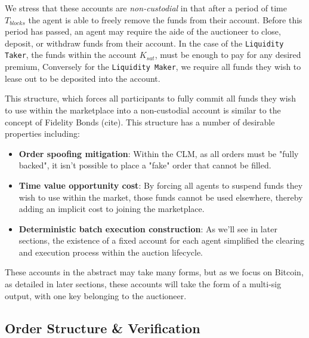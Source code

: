 \documentclass[12pt,a4paper]{article}
\theoremstyle{definition}
\begin{document}
We stress that these accounts are \emph{non-custodial} in that after a period
of time $T_{blocks}$ the agent is able to freely remove the funds from their
account. Before this period has passed, an agent may require the aide of the
auctioneer to close, deposit, or withdraw funds from their account. In the case
of the \texttt{Liquidity Taker}, the funds within the account $K_{sat}$, must
be enough to pay for any desired premium, Conversely for the \texttt{Liquidity
Maker}, we require all funds they wish to lease out to be deposited into the
account. 

This structure, which forces all participants to fully commit all funds they
wish to use within the marketplace into a non-custodial account is similar to
the concept of Fidelity Bonds (cite). This structure has a number of desirable
properties including:

\begin{itemize} %
    \item \textbf{Order spoofing mitigation}: Within the CLM, as all orders
        must be "fully backed", it isn't possible to place a "fake" order that
        cannot be filled.

    \item \textbf{Time value opportunity cost}: By forcing all agents to
        suspend funds they wish to use within the market, those funds cannot be
        used elsewhere, thereby adding an implicit cost to joining the
        marketplace. 

    \item \textbf{Deterministic batch execution construction}: As we'll see in
        later sections, the existence of a fixed account for each agent
        simplified the clearing and execution process within the auction
        lifecycle. 

\end{itemize}

These accounts in the abstract may take many forms, but as we focus on Bitcoin,
as detailed in later sections, these accounts will take the form of a multi-sig
output, with one key belonging to the auctioneer. 


\subsection{Order Structure \& Verification}
\end{document}
